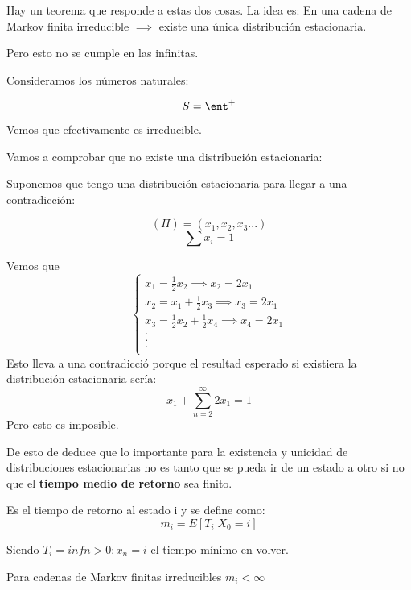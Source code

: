 Hay un teorema que responde a estas dos cosas.
La idea es:
	En una cadena de Markov finita irreducible $\implies$ existe una única distribución estacionaria.

	Pero esto no se cumple en las infinitas.
	\begin{example}
		Consideramos los números naturales:
		\begin{center}


		\end{center}
		$$S = \ent ^+$$
		Vemos que efectivamente es irreducible.

		Vamos a comprobar que no existe una distribución estacionaria:

		Suponemos que tengo una distribución estacionaria para llegar a una contradicción:

		$$(\Pi) = (x_1, x_2, x_3...)$$
		$$\sum x_i = 1$$

		Vemos que
		$$
		\begin{cases}
		x_1 = \frac{1}{2} x_2 \implies x_2 = 2x_1\\
		x_2 = x_1 + \frac{1}{2} x_3 \implies x_3 = 2x_1\\
		x_3 = \frac{1}{2} x_2 + \frac{1}{2} x_4 \implies x_4 = 2x_1\\
		.\\
		.\\
		.\\
		\end{cases}$$
		Esto lleva a una contradicció porque el resultad esperado si existiera la distribución estacionaria sería:
		$$x_1 + \sum_{n=2}^{\infty} 2 x_1 =1$$
		Pero esto es imposible.
	\end{example}



	De esto de deduce que lo importante para la existencia y unicidad de distribuciones estacionarias no es tanto que se pueda ir de un estado a otro si no que el \textbf{tiempo medio de retorno} sea finito.

	\begin{defn}
		Es el tiempo de retorno al estado i y se define como:
		$$m_i = E[T_i|X_0 = i]$$

		Siendo $T_i = inf{n>0 : x_n = i}$ el tiempo mínimo en volver.
	\end{defn}

	\obs Para cadenas de Markov finitas irreducibles $m_i < \infty$

